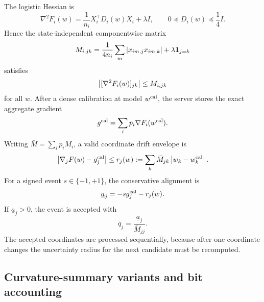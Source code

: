 The logistic Hessian is
\begin{equation}
  \nabla^2F_i(w)
  =
  \frac{1}{n_i}X_i^\top D_i(w)X_i+\lambda I,
  \qquad
  0\preceq D_i(w)\preceq\frac14 I.
\end{equation}
Hence the state-independent componentwise matrix
\begin{equation}
  M_{i,jk}
  =
  \frac{1}{4n_i}\sum_m\left|x_{im,j}x_{im,k}\right|
  +\lambda\mathbf 1_{j=k}
\end{equation}
satisfies
\begin{equation}
  \left|[\nabla^2F_i(w)]_{jk}\right|\leq M_{i,jk}
\end{equation}
for all $w$. After a dense calibration at model $w^{\rm cal}$, the server stores the exact aggregate gradient
\begin{equation}
  g^{\rm cal}=\sum_i p_i\nabla F_i(w^{\rm cal}).
\end{equation}
Writing $\bar M=\sum_i p_iM_i$, a valid coordinate drift envelope is
\begin{equation}
  \left|\nabla_jF(w)-g_j^{\rm cal}\right|
  \leq
  r_j(w)
  :=
  \sum_k\bar M_{jk}\left|w_k-w_k^{\rm cal}\right|.
\end{equation}
For a signed event $s\in\{-1,+1\}$, the conservative alignment is
\begin{equation}
  \underline a_j=-s g_j^{\rm cal}-r_j(w).
\end{equation}
If $\underline a_j>0$, the event is accepted with
\begin{equation}
  q_j=\frac{\underline a_j}{\bar M_{jj}}.
\end{equation}
The accepted coordinates are processed sequentially, because after one coordinate changes the uncertainty radius for the next candidate must be recomputed.

\subsection{Curvature-summary variants and bit accounting}


